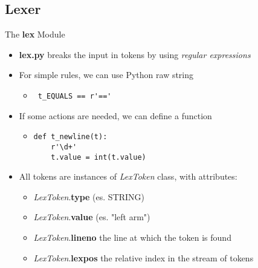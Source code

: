 \subsection{Lexer}
\begin{frame}[fragile]{The \textbf{lex} Module}
  \begin{itemize}
    \item \textbf{lex.py} breaks the input in tokens by using \emph{regular 
    expressions}
\n
    \item For simple rules, we can use Python raw string
    \begin{itemize}
      \item \begin{verbatim} t_EQUALS == r'==' \end{verbatim}
    \end{itemize}
\n
    \item If some actions are needed, we can define a function
    \begin{itemize}
      \item 
      \begin{verbatim} 
def t_newline(t):
    r'\d+'
    t.value = int(t.value) \end{verbatim}
    \end{itemize}
\n
    \item All tokens are instances of \emph{LexToken} class, with attributes:
    \begin{itemize}
      \item \emph{LexToken}.\textbf{type} \tab (es. STRING)
      \item \emph{LexToken}.\textbf{value} \tab (es. "left arm")
      \item \emph{LexToken}.\textbf{lineno} \tab the line at which the token 
      is found
      \item \emph{LexToken}.\textbf{lexpos} \tab the relative index in the stream of tokens
    \end{itemize}
  \end{itemize}
%
%
\N\N
\end{frame}


